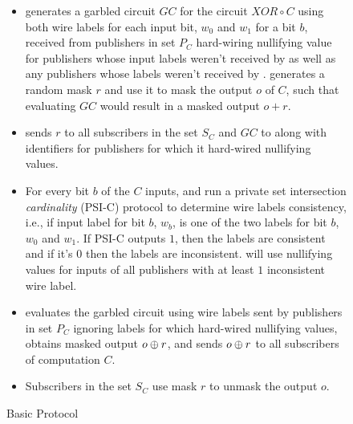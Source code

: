 \begin{figure*}[h]
\begin{mdframed}[style=myframe]
\begin{itemize}[leftmargin=18pt,itemsep=4pt,topsep=4pt]
	\item \garbler generates a garbled circuit $GC$ for the circuit $XOR \circ C$
		using both wire labels for each input bit, $w_0$ and $w_1$ for a bit $b$,
		received from publishers in set $P_C$ hard-wiring nullifying value for
		publishers whose input labels weren't received by \broker as well as any
		publishers whose labels weren't received by \garbler. \garbler generates a
		random mask $r$ and use it to mask the output $o$ of $C$, such that
		evaluating $GC$ would result in a masked output $o+r$.
		
	\item \garbler sends $r$ to all subscribers in the set $S_C$ and $GC$ to
		\broker along with identifiers for publishers for which it hard-wired
		nullifying values.

	\item For every bit $b$ of the $C$ inputs, \garbler and \broker run a private
		set intersection \emph{cardinality} (PSI-C) protocol to determine wire
		labels consistency, i.e., if \broker input label for bit $b$, $w_b$, is one
		of the two \garbler labels for bit $b$, $w_0$ and $w_1$. If PSI-C outputs
		$1$, then the labels are consistent and if it's $0$ then the labels are
		inconsistent. \garbler will use nullifying values for inputs of all
		publishers with at least $1$ inconsistent wire label. 
		
	\item \broker evaluates the garbled circuit using wire labels sent by
		publishers in set $P_C$ ignoring labels for which \garbler hard-wired
		nullifying values, obtains masked output $o \oplus r$, and sends $o \oplus r$
		to all subscribers of computation $C$.
  
	\item Subscribers in the set $S_C$ use mask $r$ to unmask the output $o$.

\end{itemize}

\end{mdframed}
\caption{Basic Protocol}
\label{fig:basicprotocol}
\end{figure*}
